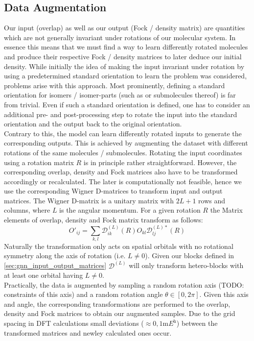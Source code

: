 \subsection{Data Augmentation}
\label{subsec:gnn_data_augmentation}
Our input (overlap) as well as our output (Fock / density matrix) are quantities which are not generally invariant under rotations of our molecular system. In essence this means that we must find a way to learn differently rotated molecules and produce their respective Fock / density matrices to later deduce our initial density. While initially the idea of making the input invariant under rotation by using a predetermined standard orientation to learn the problem was considered, problems arise with this approach. Most prominently, defining a standard orientation for isomers / isomer-parts (such as  or submolecules thereof) is far from trivial. Even if such a standard orientation is defined, one has to consider an additional pre- and post-processing step to rotate the input into the standard orientation and the output back to the original orientation. \\
Contrary to this, the model can learn differently rotated inputs to generate the corresponding outputs. This is achieved by augmenting the dataset with different rotations of the same molecules / submolecules. Rotating the input coordinates using a rotation matrix $R$ is in principle rather straightforward. However, the corresponding overlap, density and Fock matrices also have to be transformed accordingly or recalculated. The later is computationally not feasible, hence we use the corresponding Wigner D-matrices to transform input and output matrices. 
The Wigner D-matrix is a unitary matrix with $2L + 1$ rows and columns, where $L$ is the angular momentum. For a given rotation $R$ the Matrix elements of overlap, density and Fock matrix transform as follows:
\begin{equation}
    O'_{ij} = \sum_{k,l} \mathcal{D}^{(L)}_{ik}(R) O_{kl} \mathcal{D}^{(L)*}_{lj}(R)
\end{equation}
Naturally the transformation only acts on spatial orbitals with no rotational symmetry along the axis of rotation (i.e. $L \neq 0$). Given our blocks defined in \autoref{sec:gnn_input_output_matrices} $\mathcal{D}^{(L)}$ will only transform hetero-blocks with at least one orbital having $L \neq 0$. \\

Practically, the data is augmented by sampling a random rotation axis (TODO: constraints of this axis) and a random rotation angle $\theta \in [0, 2\pi]$. Given this axis and angle, the corresponding transformations are performed to the overlap, density and Fock matrices to obtain our augmented samples. 
Due to the grid spacing in DFT calculations small deviations ($\approx 0,1 \unit{\milli\hartree}$) between the transformed matrices and newley calculated ones occur.

